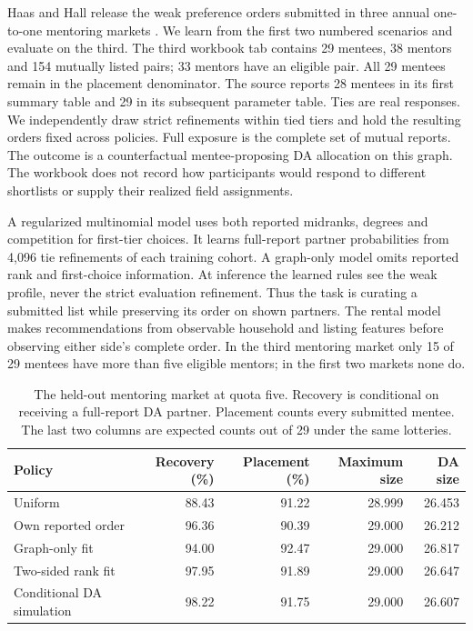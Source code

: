 Haas and Hall release the weak preference orders submitted in three annual one-to-one mentoring markets \citep{haashall2019}. We learn from the first two numbered scenarios and evaluate on the third. The third workbook tab contains 29 mentees, 38 mentors and 154 mutually listed pairs; 33 mentors have an eligible pair. All 29 mentees remain in the placement denominator. The source reports 28 mentees in its first summary table and 29 in its subsequent parameter table. Ties are real responses. We independently draw strict refinements within tied tiers and hold the resulting orders fixed across policies. Full exposure is the complete set of mutual reports. The outcome is a counterfactual mentee-proposing DA allocation on this graph. The workbook does not record how participants would respond to different shortlists or supply their realized field assignments.

A regularized multinomial model uses both reported midranks, degrees and competition for first-tier choices. It learns full-report partner probabilities from 4,096 tie refinements of each training cohort. A graph-only model omits reported rank and first-choice information. At inference the learned rules see the weak profile, never the strict evaluation refinement. Thus the task is curating a submitted list while preserving its order on shown partners. The rental model makes recommendations from observable household and listing features before observing either side's complete order. In the third mentoring market only 15 of 29 mentees have more than five eligible mentors; in the first two markets none do.

\begin{table}[t]\centering
\caption{The held-out mentoring market at quota five. Recovery is conditional on receiving a full-report DA partner. Placement counts every submitted mentee. The last two columns are expected counts out of 29 under the same lotteries.}
\label{tab:mentor-field}
\begin{tabular}{lrrrr}\toprule
Policy & Recovery (\%) & Placement (\%) & Maximum size & DA size\\ \midrule
Uniform & 88.43 & 91.22 & 28.999 & 26.453\\
Own reported order & 96.36 & 90.39 & 29.000 & 26.212\\
Graph-only fit & 94.00 & 92.47 & 29.000 & 26.817\\
Two-sided rank fit & 97.95 & 91.89 & 29.000 & 26.647\\
Conditional DA simulation & 98.22 & 91.75 & 29.000 & 26.607\\ \bottomrule
\end{tabular}
\end{table}

